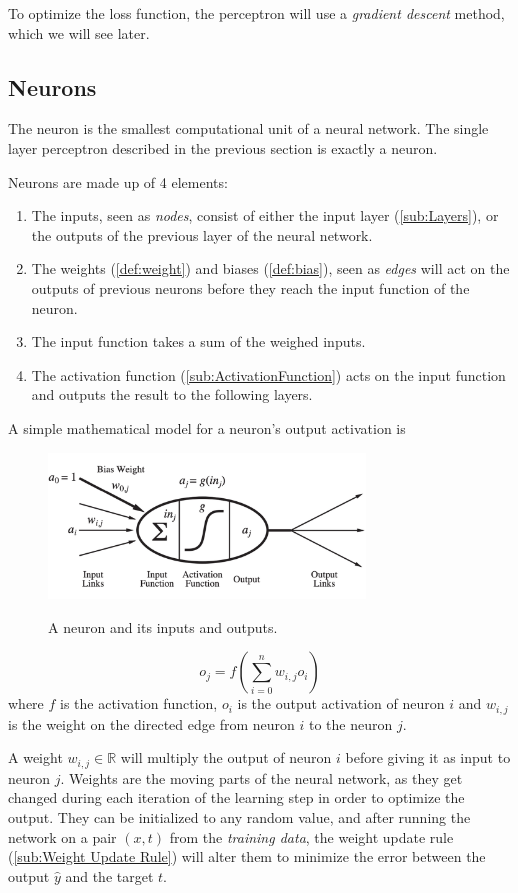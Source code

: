 \documentclass{article}
\begin{document}
 To optimize the loss function, the perceptron will use a \textit{gradient descent} method, which we will see later.
 \subsection{Neurons}%
  \label{sub:Neurons}
The neuron is the smallest computational unit of a neural network. The single layer perceptron described in the previous section is exactly a neuron.  
\begin{definition}[Neurons]
  Neurons are made up of 4 elements: 
  \begin{enumerate}
    \item The inputs, seen as \textit{nodes}, consist of either the input layer (\autoref{sub:Layers}), or the outputs of the previous layer of the neural network. 
    \item The weights (\autoref{def:weight}) and biases (\autoref{def:bias}), seen as \textit{edges} will act on the outputs of previous neurons before they reach the input function of the neuron. 
    \item The input function takes a sum of the weighed inputs. 
    \item The activation function (\autoref{sub:ActivationFunction}) acts on the input function and outputs the result to the following layers. 
  \end{enumerate}
   A simple mathematical model for a neuron's output activation is \citep{book:AIModernApp}
  \begin{figure}
    \centering
    \includegraphics[width=0.75\textwidth]{Neuron}
  \label{Neuron}
  \caption{A neuron and its inputs and outputs.}
\end{figure}
  $$o_j = f \left( \sum^{n}_{i=0}w_{i,j} o_i  \right)$$
  where $f$ is the activation function, $o_i$ is the output activation of neuron $i$ and $w_{i,j}$ is the weight on the directed edge from neuron $i$ to the neuron $j$. 
\end{definition}
\begin{definition}[Weights]\label{def:weight}
  A weight $w_{i,j} \in \mathbb{R}$ will multiply the output of neuron $i$ before giving it as input to neuron $j$. Weights are the moving parts of the neural network, as they get changed during each iteration of the learning step in order to optimize the output. They can be initialized to any random value, and after running the network on a pair $(x,t)$ from the \textit{training data}, the weight update rule (\autoref{sub:Weight Update Rule}) will alter them to minimize the error between the output $\hat y$ and the target $t.$ 
\end{definition}
\end{document}
